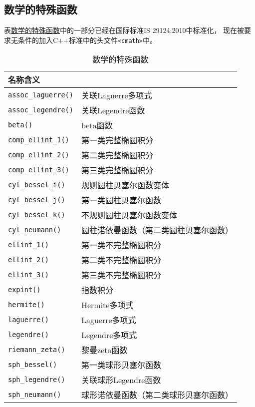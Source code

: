 \subsection{数学的特殊函数}
表\hyperref[t28.1]{数学的特殊函数}中的一部分已经在国际标准IS 29124:2010中标准化，
现在被要求无条件的加入C++标准中的头文件\texttt{<cmath>}中。
\begin{table}[htb]
    \centering
    \begin{tabular}{l|l}
        \hline
        \textbf{名称}\textbf{含义} \\
        \hline
        \texttt{assoc\_laguerre()} & 关联Laguerre多项式       \\
        \texttt{assoc\_legendre()} & 关联Legendre函数        \\
        \texttt{beta()}            & beta函数              \\
        \texttt{comp\_ellint\_1()} & 第一类完整椭圆积分           \\
        \texttt{comp\_ellint\_2()} & 第二类完整椭圆积分           \\
        \texttt{comp\_ellint\_3()} & 第三类完整椭圆积分           \\
        \texttt{cyl\_bessel\_i()}  & 规则圆柱贝塞尔函数变体         \\
        \texttt{cyl\_bessel\_j()}  & 第一类圆柱贝塞尔函数          \\
        \texttt{cyl\_bessel\_k()}  & 不规则圆柱贝塞尔函数变体        \\
        \texttt{cyl\_neumann()}    & 圆柱诺依曼函数（第二类圆柱贝塞尔函数） \\
        \texttt{ellint\_1()}       & 第一类不完整椭圆积分          \\
        \texttt{ellint\_2()}       & 第二类不完整椭圆积分          \\
        \texttt{ellint\_3()}       & 第三类不完整椭圆积分          \\
        \texttt{expint()}          & 指数积分                \\
        \texttt{hermite()}         & Hermite多项式          \\
        \texttt{laguerre()}        & Laguerre多项式         \\
        \texttt{legendre()}        & Legendre多项式         \\
        \texttt{riemann\_zeta()}   & 黎曼zeta函数            \\
        \texttt{sph\_bessel()}     & 第一类球形贝塞尔函数          \\
        \texttt{sph\_legendre()}   & 关联球形Legendre函数      \\
        \texttt{sph\_neumann()}    & 球形诺依曼函数（第二类球形贝塞尔函数） \\
        \hline
    \end{tabular}
    \caption{数学的特殊函数}
    \label{t28.1}
\end{table}

